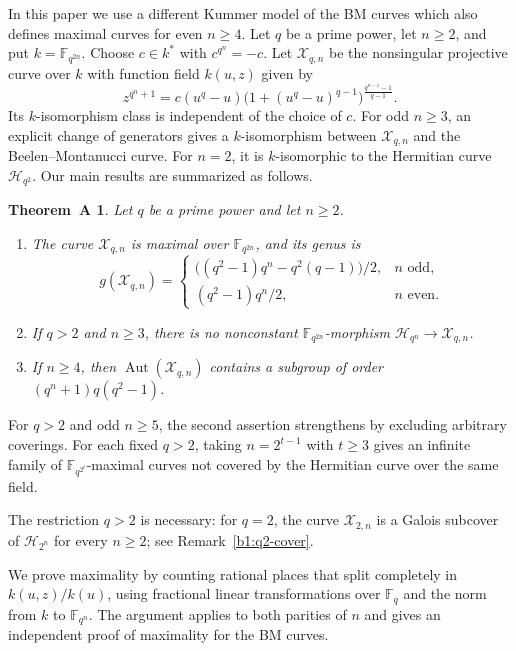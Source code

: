 \documentclass[10pt,a4paper]{amsart}
\numberwithin{equation}{section}
\newcommand{\F}{\mathbb F}
\DeclareMathOperator{\Aut}{Aut}
\newtheorem*{theoremA}{Theorem~A}
\begin{document}
In this paper we use a different Kummer model of the BM curves
which also defines maximal curves for even \(n\ge4\).
Let \(q\) be a prime power, let \(n\ge2\), and put
\(k=\F_{q^{2n}}\). Choose \(c\in k^*\) with \(c^{q^n}=-c\).
Let \(\mathcal X_{q,n}\) be the nonsingular projective curve over
\(k\) with function field \(k(u,z)\) given by
\begin{equation}
\label{b1:intro-model}
 z^{q^n+1}=c(u^q-u)
 \bigl(1+(u^q-u)^{q-1}\bigr)^{\frac{q^{n-1}-1}{q-1}}.
\end{equation}
Its \(k\)-isomorphism class is independent of the choice of \(c\).
For odd \(n\ge3\), an explicit change of generators gives a
\(k\)-isomorphism between \(\mathcal X_{q,n}\) and the
Beelen--Montanucci curve.
For \(n=2\), it is \(k\)-isomorphic to the Hermitian curve
\(\mathcal H_{q^2}\).
Our main results are summarized as follows.

\begin{theoremA}
Let \(q\) be a prime power and let \(n\ge2\).
\begin{enumerate}
\item The curve \(\mathcal X_{q,n}\) is maximal over \(\F_{q^{2n}}\), and
its genus is
\[
 g(\mathcal X_{q,n})=
 \begin{cases}
 \bigl((q^2-1)q^n-q^2(q-1)\bigr)/2,&n\text{ odd},\\
 (q^2-1)q^n/2,&n\text{ even}.
 \end{cases}
\]
\item If \(q>2\) and \(n\ge3\), there is no nonconstant
\(\F_{q^{2n}}\)-morphism \(\mathcal H_{q^n}\to\mathcal X_{q,n}\).
\item If \(n\ge4\), then \(\Aut(\mathcal X_{q,n})\) contains a subgroup
of order \((q^n+1)q(q^2-1)\).
\end{enumerate}
\end{theoremA}

For \(q>2\) and odd \(n\ge5\), the second assertion strengthens
\cite[Corollary~2.2]{BM2018} by excluding arbitrary coverings.
For each fixed \(q>2\), taking \(n=2^{t-1}\) with \(t\ge3\)
gives an infinite family of \(\F_{q^{2^t}}\)-maximal curves
not covered by the Hermitian curve over the same field.

The restriction \(q>2\) is necessary: for \(q=2\), the curve
\(\mathcal X_{2,n}\) is a Galois subcover of \(\mathcal H_{2^n}\)
for every \(n\ge2\); see Remark~\ref{b1:q2-cover}.

We prove maximality by counting rational places that split completely
in \(k(u,z)/k(u)\), using fractional linear transformations over
\(\F_q\) and the norm from \(k\) to \(\F_{q^n}\).
The argument applies to both parities of \(n\) and gives an
independent proof of maximality for the BM curves.
\end{document}

